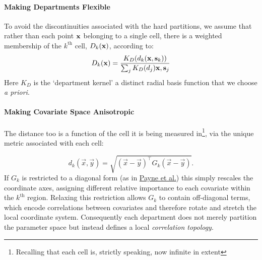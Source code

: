 		\paragraph{Making Departments Flexible} To avoid the discontinuities associated with the hard partitions, we assume that rather than each point $\mathbf{\boldsymbol{\mathrm{x}}}$ belonging to a single cell, there is a weighted membership of the $k^\text{th}$ cell, $D_k(\mathbf{\boldsymbol{\mathrm{x}}})$, according to:
		\begin{equation}
			D_k(\mathbf{\boldsymbol{\mathrm{x}}}) = \frac{K_D(d_k(\mathbf{\boldsymbol{\mathrm{x}}},\mathbf{\boldsymbol{\mathrm{s}}}_k))}{\sum_j K_D(d_j)\mathbf{\boldsymbol{\mathrm{x}}},\mathbf{\boldsymbol{\mathrm{s}}}_j}
		\end{equation}
		Here $K_D$ is the `department kernel' a distinct radial basis function that we choose \textit{a priori}.


		\paragraph{Making Covariate Space Anisotropic} The distance too is a function of the cell it is being measured in\footnote{Recalling that each cell is, strictly speaking, now infinite in extent}, via the unique metric associated with each cell:

		\begin{equation}
			d_k(\vec{x},\vec{y})
			=
			\sqrt{(\vec{x}-\vec{y})^\intercal G_k (\vec{x}-\vec{y})}.
		\end{equation}
		If $G_k$ is restricted to a diagonal form (as in  \href{https://www.jstor.org/stable/pdf/48583762.pdf}{Payne et al.}) this simply rescales the coordinate axes, assigning different relative importance to each covariate within the $k^{\text{th}}$ region. Relaxing this restriction allows $G_k$ to contain off-diagonal terms, which encode correlations between covariates and therefore rotate and stretch the local coordinate system. Consequently each department does not merely partition the parameter space but instead defines a local \emph{correlation topology}.

